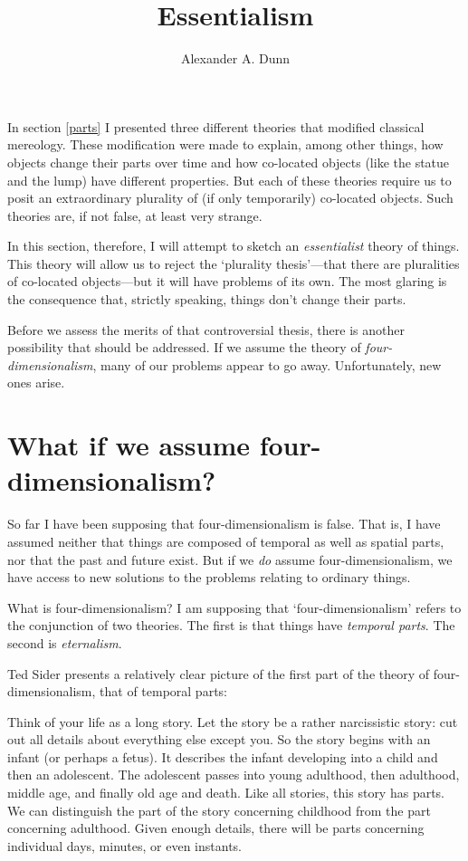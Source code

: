 \documentclass[11pt]{article}
\title{Essentialism}
\author{Alexander A. Dunn}
\newenvironment{squote}{%
\begin{spacing}{1}
\begin{list}{}{%
\setlength{\labelwidth}{0pt}%
\rightmargin\leftmargin%
}
\item\relax
}{%
\end{list}%
\end{spacing}
}
\begin{document}
\ifstandalone
\maketitle
\begin{spacing}{1.5}
\fi

\label{essential}

In section \ref{parts} I presented three different theories that
modified classical mereology.  These modification were made to
explain, among other things, how objects change their parts over time
and how co-located objects (like the statue and the lump) have
different properties.  But each of these theories require us to posit
an extraordinary plurality of (if only temporarily) co-located
objects.  Such theories are, if not false, at least very strange.

In this section, therefore, I will attempt to sketch an {\em
  essentialist} theory of things.  This theory will allow us to reject
the `plurality thesis'---that there are pluralities of co-located
objects---but it will have problems of its own.  The most glaring is
the consequence that, strictly speaking, things don't change their
parts.

Before we assess the merits of that controversial thesis, there is
another possibility that should be addressed.  If we assume the theory
of {\em four-dimensionalism}, many of our problems appear to go away.
Unfortunately, new ones arise.

\section{What if we assume four-dimensionalism?}
\label{4d}
So far I have been supposing that four-dimensionalism is false.  That
is, I have assumed neither that things are composed of temporal as
well as spatial parts, nor that the past and future exist.  But if we
{\em do} assume four-dimensionalism, we have access to new solutions
to the problems relating to ordinary things.

What is four-dimensionalism?  I am supposing that
`four-dimensionalism' refers to the conjunction of two theories.  The
first is that things have {\em temporal parts}.  The second is {\em
  eternalism}.

Ted Sider presents a relatively clear picture of the first part of the
theory of four-dimensionalism, that of temporal parts:

\begin{squote}
Think of your life as a long story.  Let the story be a rather
narcissistic story: cut out all details about everything else except
you.  So the story begins with an infant (or perhaps a fetus).  It
describes the infant developing into a child and then an adolescent.
The adolescent passes into young adulthood, then adulthood, middle
age, and finally old age and death.  Like all stories, this story has
parts.  We can distinguish the part of the story concerning childhood
from the part concerning adulthood.  Given enough details, there will
be parts concerning individual days, minutes, or even instants.


\end{squote}
\end{spacing}
\end{document}
